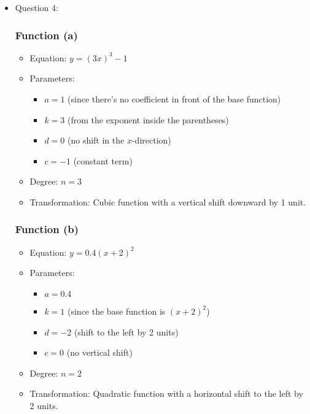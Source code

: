 \documentclass{article}
\begin{document}
\begin{itemize}
\item Question 4:
\subsubsection*{Function (a)}
\begin{itemize}
    \item Equation: \(y = (3x)^3 - 1\)
    \item Parameters:
    \begin{itemize}
        \item \(a = 1\) (since there's no coefficient in front of the base function)
        \item \(k = 3\) (from the exponent inside the parentheses)
        \item \(d = 0\) (no shift in the \(x\)-direction)
        \item \(c = -1\) (constant term)
    \end{itemize}
    \item Degree: \(n = 3\)
    \item Transformation: Cubic function with a vertical shift downward by 1 unit.
\end{itemize}

\subsubsection*{Function (b)}
\begin{itemize}
    \item Equation: \(y = 0.4(x + 2)^2\)
    \item Parameters:
    \begin{itemize}
        \item \(a = 0.4\)
        \item \(k = 1\) (since the base function is \((x + 2)^2\))
        \item \(d = -2\) (shift to the left by 2 units)
        \item \(c = 0\) (no vertical shift)
    \end{itemize}
    \item Degree: \(n = 2\)
    \item Transformation: Quadratic function with a horizontal shift to the left by 2 units.
\end{itemize}


\end{itemize}
\end{document}
